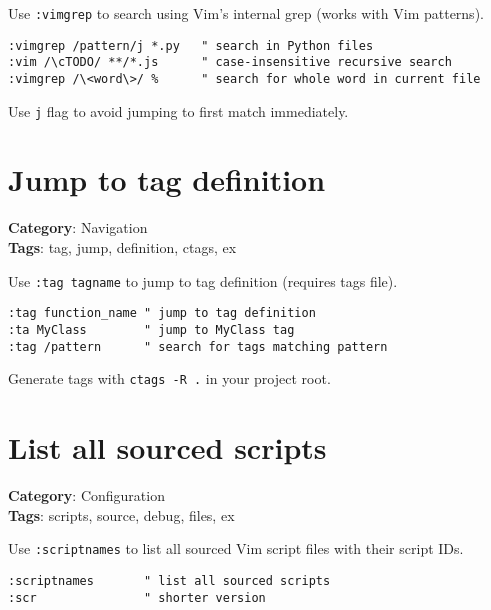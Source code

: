 {{{{{{Use {\footnotesize \Verb§:vimgrep§} to search using Vim's internal grep (works with Vim patterns).

\begin{Exa*}{}
\begin{Verbatim}[fontsize=\footnotesize, breaklines, breakanywhere]
:vimgrep /pattern/j *.py   " search in Python files
:vim /\cTODO/ **/*.js      " case-insensitive recursive search
:vimgrep /\<word\>/ %      " search for whole word in current file
\end{Verbatim}
\end{Exa*}

Use {\footnotesize \Verb§j§} flag to avoid jumping to first match immediately.

\section{Jump to tag definition}

\textbf{Category}: Navigation\\ \textbf{Tags}: tag, jump, definition, ctags, ex
\vspace{0.5cm}

Use {\footnotesize \Verb§:tag tagname§} to jump to tag definition (requires tags file).

\begin{Exa*}{}
\begin{Verbatim}[fontsize=\footnotesize, breaklines, breakanywhere]
:tag function_name " jump to tag definition
:ta MyClass        " jump to MyClass tag
:tag /pattern      " search for tags matching pattern
\end{Verbatim}
\end{Exa*}

Generate tags with {\footnotesize \Verb§ctags -R .§} in your project root.

\section{List all sourced scripts}

\textbf{Category}: Configuration\\ \textbf{Tags}: scripts, source, debug, files, ex
\vspace{0.5cm}

Use {\footnotesize \Verb§:scriptnames§} to list all sourced Vim script files with their script IDs.

\begin{Exa*}{}
\begin{Verbatim}[fontsize=\footnotesize, breaklines, breakanywhere]
:scriptnames       " list all sourced scripts
:scr               " shorter version
\end{Verbatim}
\end{Exa*}

}}}}}}
